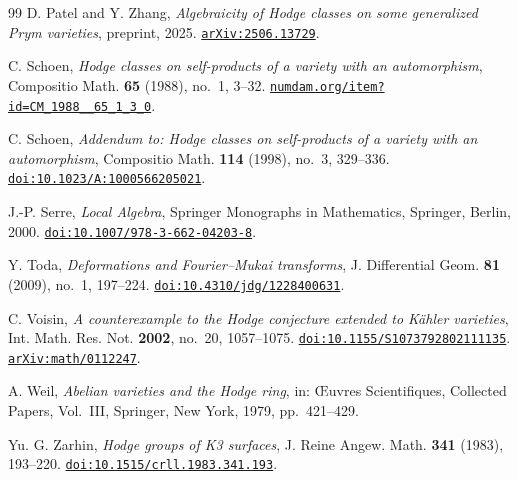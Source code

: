 \begin{thebibliography}{99}
D. Patel and Y. Zhang,
\emph{Algebraicity of Hodge classes on some generalized Prym varieties},
preprint, 2025.
\href{https://arxiv.org/abs/2506.13729}{\texttt{arXiv:2506.13729}}.

C. Schoen,
\emph{Hodge classes on self-products of a variety with an automorphism},
Compositio Math. \textbf{65} (1988), no.~1, 3--32.
\href{http://www.numdam.org/item?id=CM_1988__65_1_3_0}{\texttt{numdam.org/item?id=CM\_1988\_\_65\_1\_3\_0}}.

C. Schoen,
\emph{Addendum to: Hodge classes on self-products of a variety with an
automorphism},
Compositio Math. \textbf{114} (1998), no.~3, 329--336.
\href{https://doi.org/10.1023/A:1000566205021}{\texttt{doi:10.1023/A:1000566205021}}.

J.-P. Serre,
\emph{Local Algebra},
Springer Monographs in Mathematics,
Springer, Berlin, 2000.
\href{https://doi.org/10.1007/978-3-662-04203-8}{\texttt{doi:10.1007/978-3-662-04203-8}}.

Y. Toda,
\emph{Deformations and Fourier--Mukai transforms},
J. Differential Geom. \textbf{81} (2009), no.~1, 197--224.
\href{https://doi.org/10.4310/jdg/1228400631}{\texttt{doi:10.4310/jdg/1228400631}}.

C. Voisin,
\emph{A counterexample to the Hodge conjecture extended to K\"ahler
varieties},
Int. Math. Res. Not. \textbf{2002}, no.~20, 1057--1075.
\href{https://doi.org/10.1155/S1073792802111135}{\texttt{doi:10.1155/S1073792802111135}}.
\href{https://arxiv.org/abs/math/0112247}{\texttt{arXiv:math/0112247}}.

A. Weil,
\emph{Abelian varieties and the Hodge ring},
in: \OE uvres Scientifiques, Collected Papers, Vol.~III,
Springer, New York, 1979, pp.~421--429.

Yu. G. Zarhin,
\emph{Hodge groups of K3 surfaces},
J. Reine Angew. Math. \textbf{341} (1983), 193--220.
\href{https://doi.org/10.1515/crll.1983.341.193}{\texttt{doi:10.1515/crll.1983.341.193}}.

\end{thebibliography}
